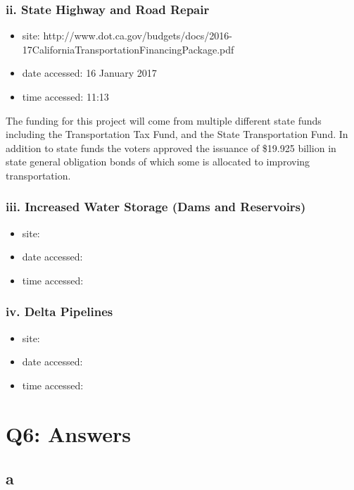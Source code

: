 \documentclass[12pt]{article} %
\begin{document}
		\subsubsection{ii. State Highway and Road Repair}
			\begin{itemize}
				\item site: {\small http://www.dot.ca.gov/budgets/docs/2016-17CaliforniaTransportationFinancingPackage.pdf}
				\item date accessed: 16 January 2017
				\item time accessed: 11:13
			\end{itemize}
	
			The funding for this project will come from multiple different state funds including the Transportation Tax Fund, and the State Transportation Fund. In addition to state funds the voters approved the issuance of \$19.925 billion in state general obligation bonds of which some is allocated to improving transportation.
		
		\subsubsection{iii. Increased Water Storage (Dams and Reservoirs)}
			\begin{itemize}
				\item site: 
				\item date accessed: 
				\item time accessed: 
			\end{itemize}
		
		\subsubsection{iv. Delta Pipelines}
			\begin{itemize}
				\item site: 
				\item date accessed: 
				\item time accessed: 
			\end{itemize}


\section{Q6: Answers}

	\subsection{a}
	
\end{document}
